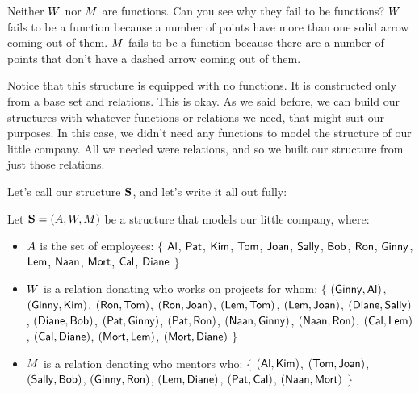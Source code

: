 \documentclass[../../../main.tex]{subfiles}
\begin{document}
\begin{aside}
  \begin{remark}
     Neither $W$ nor $M$ are functions. Can you see why they fail to be functions? $W$ fails to be a function because a number of points have more than one solid arrow coming out of them. $M$ fails to be a function because there are a number of points that don't have a dashed arrow coming out of them.
  \end{remark}
\end{aside}

Notice that this structure is equipped with no functions. It is constructed only from a base set and relations. This is okay. As we said before, we can build our structures with whatever functions or relations we need, that might suit our purposes. In this case, we didn't need any functions to model the structure of our little company. All we needed were relations, and so we built our structure from just those relations.

Let's call our structure $\mathbf{S}$, and let's write it all out fully:

\begin{framed}
  Let $\mathbf{S} = (A, W, M)$ be a structure that models our little company, where:
  
  \begin{itemize}
  
    \item $A$ is the set of employees: $\{$ $\mathsf{Al}$, $\mathsf{Pat}$, $\mathsf{Kim}$, $\mathsf{Tom}$, $\mathsf{Joan}$, $\mathsf{Sally}$, $\mathsf{Bob}$, $\mathsf{Ron}$, $\mathsf{Ginny}$, $\mathsf{Lem}$, $\mathsf{Naan}$, $\mathsf{Mort}$, $\mathsf{Cal}$, $\mathsf{Diane}$ $\}$
    
    \item $W$ is a relation donating who works on projects for whom: $\{$ $(\mathsf{Ginny}, \mathsf{Al})$, $(\mathsf{Ginny}, \mathsf{Kim})$, $(\mathsf{Ron}, \mathsf{Tom})$, $(\mathsf{Ron}, \mathsf{Joan})$, $(\mathsf{Lem}, \mathsf{Tom})$, $(\mathsf{Lem}, \mathsf{Joan})$, $(\mathsf{Diane}, \mathsf{Sally})$, $(\mathsf{Diane}, \mathsf{Bob})$, $(\mathsf{Pat}, \mathsf{Ginny})$, $(\mathsf{Pat}, \mathsf{Ron})$, $(\mathsf{Naan}, \mathsf{Ginny})$, $(\mathsf{Naan}, \mathsf{Ron})$, $(\mathsf{Cal}, \mathsf{Lem})$, $(\mathsf{Cal}, \mathsf{Diane})$, $(\mathsf{Mort}, \mathsf{Lem})$, $(\mathsf{Mort}, \mathsf{Diane})$ $\}$
    
    \item $M$ is a relation denoting who mentors who: $\{$ $(\mathsf{Al}, \mathsf{Kim})$, $(\mathsf{Tom}, \mathsf{Joan})$, $(\mathsf{Sally}, \mathsf{Bob})$, $(\mathsf{Ginny}, \mathsf{Ron})$, $(\mathsf{Lem}, \mathsf{Diane})$, $(\mathsf{Pat}, \mathsf{Cal})$, $(\mathsf{Naan}, \mathsf{Mort})$ $\}$
  \end{itemize}
\end{framed}
\end{document}
